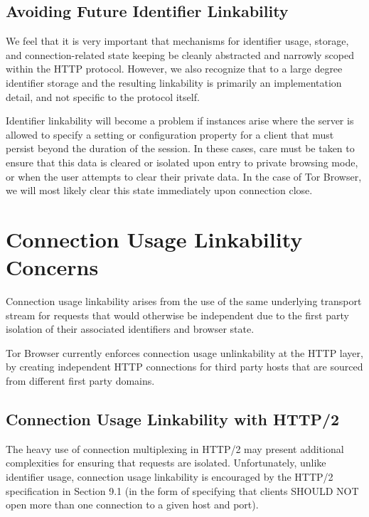 \documentclass[letterpaper,11pt]{llncs}
\begin{document}
\subsection{Avoiding Future Identifier Linkability}

We feel that it is very important that mechanisms for identifier usage,
storage, and connection-related state keeping be cleanly abstracted and
narrowly scoped within the HTTP protocol. However, we also recognize that to a
large degree identifier storage and the resulting linkability is primarily an
implementation detail, and not specific to the protocol itself.

Identifier linkability will become a problem if instances arise where the
server is allowed to specify a setting or configuration property for a client
that must persist beyond the duration of the session. In these cases, care
must be taken to ensure that this data is cleared or isolated upon entry to
private browsing mode, or when the user attempts to clear their private data.
In the case of Tor Browser, we will most likely clear this state immediately
upon connection close.

\section{Connection Usage Linkability Concerns}

Connection usage linkability arises from the use of the same underlying
transport stream for requests that would otherwise be independent due to the
first party isolation of their associated identifiers and browser state.

Tor Browser currently enforces connection usage unlinkability at the HTTP
layer, by creating independent HTTP connections for third party hosts that
are sourced from different first party domains.

\subsection{Connection Usage Linkability with HTTP/2}

The heavy use of connection multiplexing in HTTP/2 may present additional
complexities for ensuring that requests are isolated. Unfortunately, unlike
identifier usage, connection usage linkability is encouraged by the
HTTP/2 specification in Section 9.1 (in the form of specifying that clients
SHOULD NOT open more than one connection to a given host and port).
\end{document}

